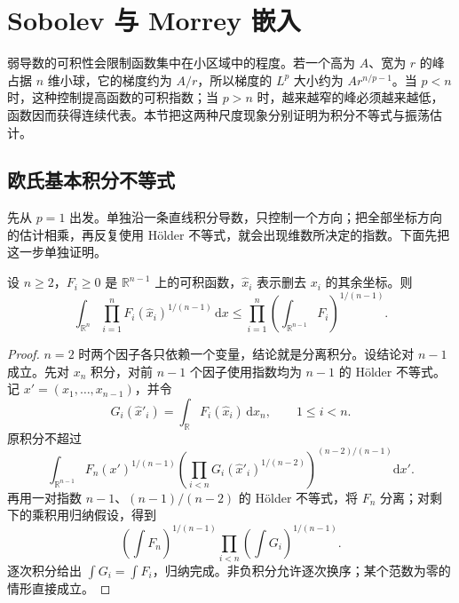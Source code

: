 
% 
% 

\section{Sobolev 与 Morrey 嵌入}
\label{g3:sec:1103}

弱导数的可积性会限制函数集中在小区域中的程度。若一个高为 \(A\)、宽为 \(r\) 的峰占据 \(n\) 维小球，它的梯度约为 \(A/r\)，所以梯度的 \(L^p\) 大小约为 \(Ar^{n/p-1}\)。当 \(p<n\) 时，这种控制提高函数的可积指数；当 \(p>n\) 时，越来越窄的峰必须越来越低，函数因而获得连续代表。本节把这两种尺度现象分别证明为积分不等式与振荡估计。

\subsection{欧氏基本积分不等式}
\label{g3:subsec:1103:01}
先从 \(p=1\) 出发。单独沿一条直线积分导数，只控制一个方向；把全部坐标方向的估计相乘，再反复使用 Hölder 不等式，就会出现维数所决定的指数。下面先把这一步单独证明。

\begin{lemma}\label{g3:lem:coordinate-product-integral}
	设 \(n\ge2\)，\(F_i\ge0\) 是 \(\mathbb R^{n-1}\) 上的可积函数，\(\widehat x_i\) 表示删去 \(x_i\) 的其余坐标。则
	\[
		\int_{\mathbb R^n}\prod_{i=1}^nF_i(\widehat x_i)^{1/(n-1)}\,\mathrm dx
		\le\prod_{i=1}^n\left(\int_{\mathbb R^{n-1}}F_i\right)^{1/(n-1)}.
	\]
\end{lemma}
\begin{proof}
	\(n=2\) 时两个因子各只依赖一个变量，结论就是分离积分。设结论对 \(n-1\) 成立。先对 \(x_n\) 积分，对前 \(n-1\) 个因子使用指数均为 \(n-1\) 的 Hölder 不等式。记 \(x'=(x_1,\ldots,x_{n-1})\)，并令
	\[
		G_i(\widehat x'_i)=\int_{\mathbb R}F_i(\widehat x_i)\,\mathrm dx_n,
		\qquad 1\le i<n.
	\]
	原积分不超过
	\[
		\int_{\mathbb R^{n-1}}F_n(x')^{1/(n-1)}
		\left(\prod_{i<n}G_i(\widehat x'_i)^{1/(n-2)}\right)^{(n-2)/(n-1)}\mathrm dx'.
	\]
	再用一对指数 \(n-1\)、\((n-1)/(n-2)\) 的 Hölder 不等式，将 \(F_n\) 分离；对剩下的乘积用归纳假设，得到
	\[
		\left(\int F_n\right)^{1/(n-1)}
		\prod_{i<n}\left(\int G_i\right)^{1/(n-1)}.
	\]
	逐次积分给出 \(\int G_i=\int F_i\)，归纳完成。非负积分允许逐次换序；某个范数为零的情形直接成立。
\end{proof}

